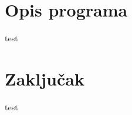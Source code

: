 \documentclass[a4paper,11pt]{article}
\begin{document}
\section{Opis programa}
test
\newpage

\section{Zaključak}
test
\newpage

\pagestyle{plain}
\renewcommand\refname{Literatura}


\end{document}
